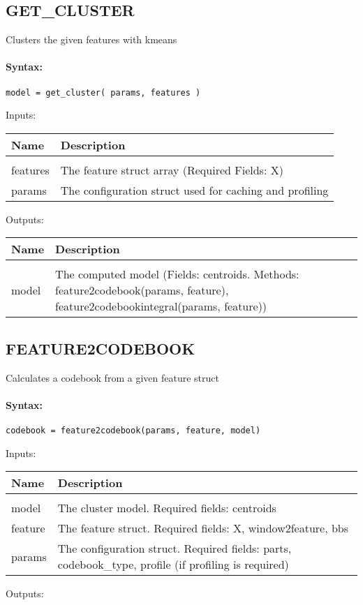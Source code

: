 \subsection{GET\_CLUSTER}

Clusters the given features with kmeans

\paragraph{Syntax:} \verb|model = get_cluster( params, features )|

Inputs:

\begin{tabular}{|l|p{5cm}|}
\hline
\textbf{Name} & \textbf{Description} \\
\hline \hline \\
features & The feature struct array (Required Fields: X)  \\ \hline
params & The configuration struct used for caching and profiling  \\ \hline
\end{tabular}
Outputs:

\begin{tabular}{|l|p{5cm}|}
\hline
\textbf{Name} & \textbf{Description} \\
\hline \hline \\
model & The computed model (Fields: centroids. Methods: feature2codebook(params, feature), feature2codebookintegral(params, feature))  \\ \hline
\end{tabular}

\subsection{FEATURE2CODEBOOK}

Calculates a codebook from a given feature struct

\paragraph{Syntax:} \verb|codebook = feature2codebook(params, feature, model)|

Inputs:

\begin{tabular}{|l|p{5cm}|}
\hline
\textbf{Name} & \textbf{Description} \\
\hline \hline \\
model & The cluster model. Required fields: centroids  \\ \hline
feature & The feature struct. Required fields: X, window2feature, bbs  \\ \hline
params & The configuration struct. Required fields: parts, codebook\_type, profile (if profiling is required)  \\ \hline
\end{tabular}
Outputs:

